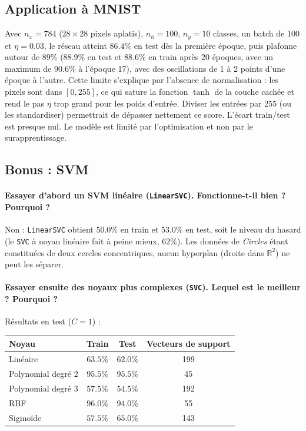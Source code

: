 \documentclass{report}
\begin{document}
\subsection{Application à MNIST}
Avec $n_x = 784$ ($28 \times 28$ pixels aplatis), $n_h = 100$, $n_y = 10$ classes, un batch de 100 et $\eta = 0.03$, le réseau atteint $86.4\%$ en test dès la première époque, puis plafonne autour de $89\%$ ($88.9\%$ en test et $88.6\%$ en train après 20 époques, avec un maximum de $90.6\%$ à l'époque 17), avec des oscillations de 1 à 2 points d'une époque à l'autre. Cette limite s'explique par l'absence de normalisation : les pixels sont dans $[0, 255]$, ce qui sature la fonction $\tanh$ de la couche cachée et rend le pas $\eta$ trop grand pour les poids d'entrée. Diviser les entrées par 255 (ou les standardiser) permettrait de dépasser nettement ce score. L'écart train/test est presque nul. Le modèle est limité par l'optimisation et non par le surapprentissage.

\subsection{Bonus : SVM}

\paragraph{Essayer d'abord un SVM linéaire (\texttt{LinearSVC}). Fonctionne-t-il bien ? Pourquoi ?}
Non : \texttt{LinearSVC} obtient $50.0\%$ en train et $53.0\%$ en test, soit le niveau du hasard (le \texttt{SVC} à noyau linéaire fait à peine mieux, $62\%$). Les données de \textit{Circles} étant constituées de deux cercles concentriques, aucun hyperplan (droite dans $\mathbb{R}^2$) ne peut les séparer.

\paragraph{Essayer ensuite des noyaux plus complexes (\texttt{SVC}). Lequel est le meilleur ? Pourquoi ?}
Résultats en test ($C = 1$) :
\begin{table}[H]
\centering
\small
\begin{tabular}{lccc}
\toprule
\textbf{Noyau} & \textbf{Train} & \textbf{Test} & \textbf{Vecteurs de support} \\
\midrule
Linéaire & $63.5\%$ & $62.0\%$ & 199 \\
Polynomial degré 2 & $95.5\%$ & $\mathbf{95.5\%}$ & 45 \\
Polynomial degré 3 & $57.5\%$ & $54.5\%$ & 192 \\
RBF & $96.0\%$ & $94.0\%$ & 55 \\
Sigmoïde & $57.5\%$ & $65.0\%$ & 143 \\
\bottomrule
\end{tabular}
\end{table}
\end{document}
